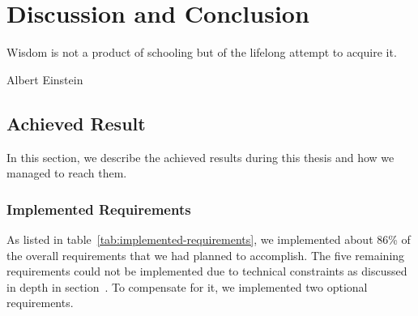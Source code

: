 \chapter{Discussion and Conclusion}
\epigraph{Wisdom is not a product of schooling but of the lifelong attempt to acquire it.}{Albert Einstein}
\section{Achieved Result}

In this section, we describe the achieved results during this thesis and how we managed to reach them.

\subsection{Implemented Requirements}

As listed in table~\ref{tab:implemented-requirements}, we implemented about 86\% of the overall requirements that we had planned to accomplish.
The five remaining requirements could not be implemented due to technical constraints as discussed in depth in section~.
To compensate for it, we implemented two optional requirements.

